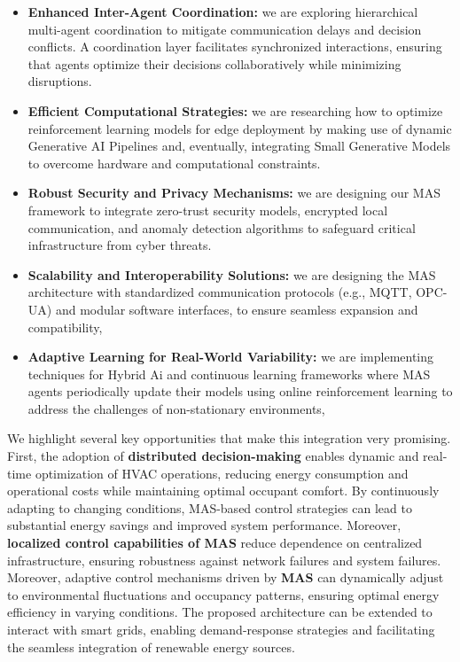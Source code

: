 \documentclass{svproc}
\begin{document}
\begin{itemize}
    \item \textbf{Enhanced Inter-Agent Coordination:} we are exploring hierarchical multi-agent coordination to mitigate communication delays and decision conflicts. A coordination layer facilitates synchronized interactions, ensuring that agents optimize their decisions collaboratively while minimizing disruptions.
    \item \textbf{Efficient Computational Strategies:} we are researching how to optimize reinforcement learning models for edge deployment by making use of dynamic Generative AI Pipelines and, eventually, integrating Small Generative Models to overcome hardware and computational constraints.
    \item \textbf{Robust Security and Privacy Mechanisms:} we are designing our MAS framework to integrate zero-trust security models, encrypted local communication, and anomaly detection algorithms to safeguard critical infrastructure from cyber threats. 
    \item \textbf{Scalability and Interoperability Solutions:} we are designing the MAS architecture with standardized communication protocols (e.g., MQTT, OPC-UA) and modular software interfaces, to ensure seamless expansion and compatibility, 
    \item \textbf{Adaptive Learning for Real-World Variability:}  we are implementing techniques for Hybrid Ai and  continuous learning frameworks where MAS agents periodically update their models using online reinforcement learning to address the challenges of non-stationary environments,
\end{itemize}

We highlight several key opportunities that make this integration very promising. First, the adoption of \textbf{distributed decision-making} enables dynamic and real-time optimization of HVAC operations, reducing energy consumption and operational costs while maintaining optimal occupant comfort. By continuously adapting to changing conditions, MAS-based control strategies can lead to substantial energy savings and improved system performance. Moreover,  \textbf{localized control capabilities of MAS} reduce dependence on centralized infrastructure, ensuring robustness against network failures and system failures. Moreover, adaptive control mechanisms driven by \textbf{ MAS} can dynamically adjust to environmental fluctuations and occupancy patterns, ensuring optimal energy efficiency in varying conditions.  The proposed architecture can be extended to interact with smart grids, enabling demand-response strategies and facilitating the seamless integration of renewable energy sources.  
\end{document}
